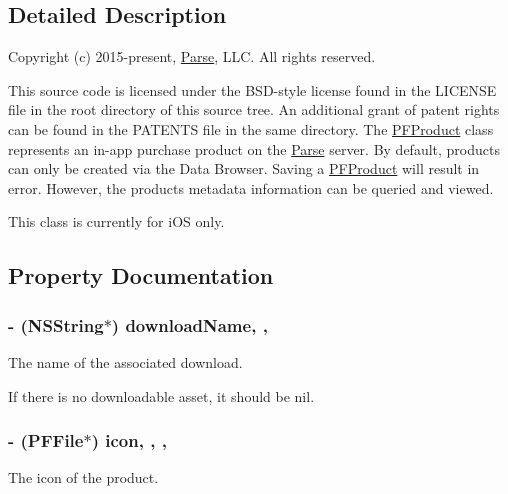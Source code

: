\subsection{Detailed Description}
Copyright (c) 2015-\/present, \hyperlink{interface_parse}{Parse}, L\+L\+C. All rights reserved.

This source code is licensed under the B\+S\+D-\/style license found in the L\+I\+C\+E\+N\+S\+E file in the root directory of this source tree. An additional grant of patent rights can be found in the P\+A\+T\+E\+N\+T\+S file in the same directory. The {\ttfamily \hyperlink{interface_p_f_product}{P\+F\+Product}} class represents an in-\/app purchase product on the \hyperlink{interface_parse}{Parse} server. By default, products can only be created via the Data Browser. Saving a {\ttfamily \hyperlink{interface_p_f_product}{P\+F\+Product}} will result in error. However, the products\textquotesingle{} metadata information can be queried and viewed.

This class is currently for i\+O\+S only. 

\subsection{Property Documentation}
\hypertarget{interface_p_f_product_a1462cf0bd4dffe98775e3439208ec238}{}
\subsubsection[{download\+Name}]{\setlength{\rightskip}{0pt plus 5cm}-\/ (N\+S\+String$\ast$) download\+Name\hspace{0.3cm}{\ttfamily [read]}, {\ttfamily [nonatomic]}, {\ttfamily [strong]}}\label{interface_p_f_product_a1462cf0bd4dffe98775e3439208ec238}
The name of the associated download.

If there is no downloadable asset, it should be {\ttfamily nil}. \hypertarget{interface_p_f_product_a23132bc0aeaa67fa7d7e49b477818477}{}
\subsubsection[{icon}]{\setlength{\rightskip}{0pt plus 5cm}-\/ ({\bf P\+F\+File}$\ast$) icon\hspace{0.3cm}{\ttfamily [read]}, {\ttfamily [write]}, {\ttfamily [nonatomic]}, {\ttfamily [strong]}}\label{interface_p_f_product_a23132bc0aeaa67fa7d7e49b477818477}
The icon of the product. \hypertarget{interface_p_f_product_a8e78e9f4607e77954c425698ec7a151f}{}

